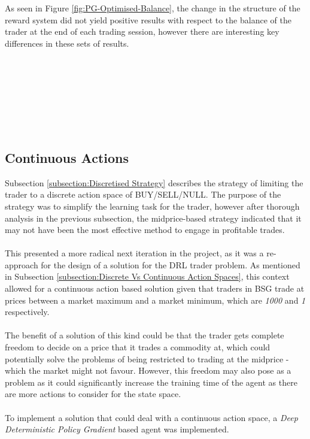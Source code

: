 \documentclass[ %
                    author={Ashwinder Khurana},
                supervisor={Prof Dave Cliff},
                    degree={MEng},
                     title={The Deeply Reinforced Trader},
                  subtitle={},
                      type={enterprise},
                      year={2020} ]{dissertation}
\begin{document}
{As seen in Figure \ref{fig:PG-Optimised-Balance}, the change in the structure of the reward system did not yield positive results with respect to the balance of the trader at the end of each trading session, however there are interesting key differences in these sets of results.  
\\
\\
{\color{red}{Despite a more refined reward system - similar results in terms of number of trades decreasing}}
\\
\\
{\color{red}{Analysis indicates that the trader is learning to maximise the reward, which should correlate to better trades. suggests that the trader has the right intention, however is not able to engage in trades. Re ran experiments to see how many orders were submitted did not lead to transaction}}
\\
\\
{\color{red}{Midprice consistently becomes 1, trading at a huge loss, and numerous occasions }}
\\
\\
{\color{red}{Suggests that trading at a midprice is not an effective price point to trade at, which leads to a decision of exploring a continuous state space in which trader can choose to buy and sell, and choose the price it quotes.}}


\subsection{Continuous Actions}
Subsection \ref{subsection:Discretised Strategy} describes the strategy of limiting the trader to a discrete action space of BUY/SELL/NULL. The purpose of the strategy was to simplify the learning task for the trader, however after thorough analysis in the previous subsection, the midprice-based strategy indicated that it may not have been the most effective method to engage in profitable trades.
\\
\\
\noindent
This presented a more radical next iteration in the project, as it was a re-approach for the design of a solution for the DRL trader problem. As mentioned in Subsection \ref{subsection:Discrete Vs Continuous Action Spaces}, this context allowed for a continuous action based solution given that traders in BSG trade at prices between a market maximum and a market minimum, which are \textit{1000} and \textit{1} respectively. 
\\
\\
The benefit of a solution of this kind could be that the trader gets complete freedom to decide on a price that it trades a commodity at, which could potentially solve the problems of being restricted to trading at the midprice - which the market might not favour. However, this freedom may also pose as a problem as it could significantly increase the training time of the agent as there are more actions to consider for the state space. 
\\
\\
To implement a solution that could deal with a continuous action space, a \textit{Deep Deterministic Policy Gradient} based agent was implemented.
}
\end{document}
